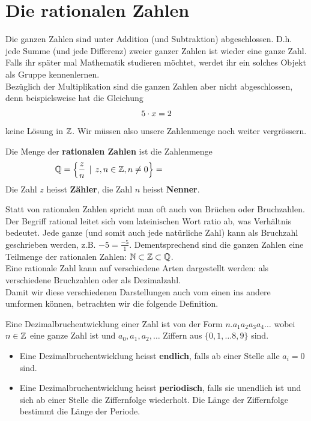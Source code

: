 \documentclass[11pt,oneside]{article}
\begin{document}
\section{Die rationalen Zahlen}
    Die ganzen Zahlen sind unter Addition (und Subtraktion) abgeschlossen. D.h. jede Summe (und jede Differenz) zweier ganzer Zahlen ist wieder eine ganze Zahl. Falls ihr später mal Mathematik studieren möchtet, werdet ihr ein solches Objekt als \glqq Gruppe\grqq\: kennenlernen. \\
    Bezüglich der Multiplikation sind die ganzen Zahlen aber nicht abgeschlossen, denn beispielsweise hat die Gleichung
    \[5\cdot x = 2\]
    keine Lösung in $\mathbb{Z}$. Wir müssen also unsere Zahlenmenge noch weiter vergrössern.
    \begin{definition}
    	Die Menge der \textbf{rationalen Zahlen} ist die Zahlenmenge
    	\[\Q = \left\{\frac{z}{n} \mid z, n\in\Z, n\neq 0 \right\}=\hspace*{4cm}\]
    	Die Zahl $z$ heisst \textbf{Zähler}, die Zahl $n$ heisst \textbf{Nenner}.
    \end{definition}
    Statt von rationalen Zahlen spricht man oft auch von \glqq Brüchen\grqq\: oder \glqq Bruchzahlen\grqq. Der Begriff \glqq rational\grqq\: leitet sich vom lateinischen Wort \glqq ratio\grqq\: ab, was \glqq Verhältnis\grqq\: bedeutet. Jede ganze (und somit auch jede natürliche Zahl) kann als Bruchzahl geschrieben werden, z.B. $-5=\frac{-5}{1}$. Dementsprechend sind die ganzen Zahlen eine Teilmenge der rationalen Zahlen: $\mathbb{N}\subset\mathbb{Z}\subset\mathbb{Q}$.\vspace{3cm}\\
    Eine rationale Zahl kann auf verschiedene Arten dargestellt werden: als verschiedene Bruchzahlen oder als Dezimalzahl.\vspace{2cm}\\
    Damit wir diese verschiedenen Darstellungen auch vom einen ins andere umformen können, betrachten wir die folgende Definition.
    \begin{definition}
        Eine Dezimalbruchentwicklung einer Zahl ist von der Form $ n.a_{1}a_{2}a_{3}a_{4}\ldots $ wobei $n\in\mathbb{Z}$ eine ganze Zahl ist und $a_{0}, a_{1}, a_{2}, \ldots $ Ziffern aus $\{0,1,\ldots8,9\} $ sind.
        \begin{itemize}
        	\item Eine Dezimalbruchentwicklung heisst \textbf{endlich}, falls ab einer Stelle alle $ a_{i}=0 $ sind.
        	\item Eine Dezimalbruchentwicklung heisst \textbf{periodisch}, falls sie unendlich ist und sich ab einer Stelle die Ziffernfolge wiederholt. Die Länge der Ziffernfolge bestimmt die Länge der Periode.
        \end{itemize}
    \end{definition}
\end{document}
